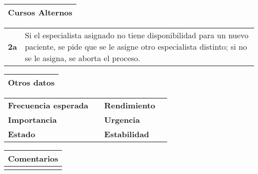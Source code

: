 \documentclass[11pt,a4paper]{article}
\begin{document}
\begin{table}[H]
	\begin{tabularx}{\textwidth}{X}
		\textbf{Cursos Alternos}\\ \hline
	\end{tabularx}
	\begin{tabularx}{\textwidth}{cX}
		\textbf{2a} & Si el especialista asignado no tiene disponibilidad para un nuevo paciente, se pide que se le asigne otro especialista distinto; si no se le asigna, se aborta el proceso. \\
	\end{tabularx}
\end{table}

\begin{table}[H]
	\begin{tabularx}{\textwidth}{X}
		\textbf{Otros datos}\\ \hline
	\end{tabularx}
	\begin{tabularx}{\textwidth}{lXlX}
		\textbf{Frecuencia esperada} &  & \textbf{Rendimiento} & \\
		\textbf{Importancia} & & \textbf{Urgencia} & \\
		\textbf{Estado} &  & \textbf{Estabilidad} & \\
	\end{tabularx}
	
	\bigskip
	
	\begin{tabularx}{\textwidth}{X}
		\textbf{Comentarios}\\ \hline
		[...] \\
	\end{tabularx}
\end{table}
\newpage

\end{document}
